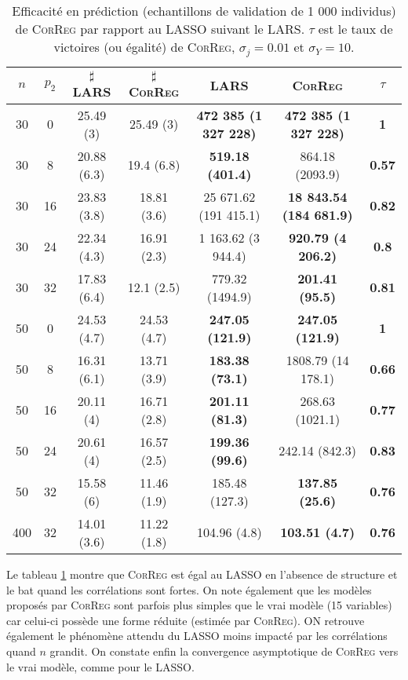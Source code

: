 \documentclass[12pt]{article}
\begin{document}
\begin{table}[h!]
\centering 
\begin{tabular}{|c|c|c|c|c|c|c|}
\hline 
$n$ & $p_2$ & $\sharp$ LARS & $\sharp$ \textsc{CorReg} &LARS & \textsc{CorReg} & $\tau$ \\ 
\hline  
30 & 0 & 25.49 (3) & 25.49 (3) & \textbf{472 385 (1 327 228)} & \textbf{472 385 (1 327 228)} & \textbf{1} \\
\hline 
30 & 8 & 20.88 (6.3) & 19.4 (6.8) & \textbf{519.18 (401.4)} & 864.18 (2093.9) &\textbf{ 0.57}  \\ 
\hline 
30 & 16 & 23.83 (3.8) & 18.81 (3.6) & 25 671.62 (191 415.1) & \textbf{18 843.54 (184 681.9)} & \textbf{0.82} \\ 
\hline 
30 & 24 & 22.34 (4.3) & 16.91 (2.3) & 1 163.62 (3 944.4) & \textbf{920.79 (4 206.2)} & \textbf{0.8} \\ 
\hline 
30 & 32 & 17.83 (6.4) & 12.1 (2.5) & 779.32 (1494.9) & \textbf{201.41 (95.5)} & \textbf{0.81}\\ 
\hline 
50 & 0 & 24.53 (4.7) & 24.53 (4.7) & \textbf{247.05 (121.9)} & \textbf{247.05 (121.9)} & \textbf{1}  \\ 
\hline 
50 & 8 & 16.31 (6.1) & 13.71 (3.9) & \textbf{183.38 (73.1)} & 1808.79 (14 178.1) & \textbf{0.66}\\ 
\hline 
50 & 16 & 20.11 (4) & 16.71 (2.8) & \textbf{201.11 (81.3)} & 268.63 (1021.1) & \textbf{0.77}\\ 
\hline 
50 & 24 &20.61 (4) & 16.57 (2.5) & \textbf{199.36 (99.6)} & 242.14 (842.3) & \textbf{0.83} \\ 
\hline 
50 & 32 & 15.58 (6) & 11.46 (1.9) & 185.48 (127.3) & \textbf{137.85 (25.6)} & \textbf{0.76 } \\ 
\hline 
400 & 32 & 14.01 (3.6) & 11.22 (1.8) & 104.96 (4.8) & \textbf{103.51 (4.7)} & \textbf{0.76}\\ 
\hline 
\end{tabular} 
\caption{Efficacité en prédiction (echantillons de validation de 1 000 individus) de \textsc{CorReg} par rapport au LASSO suivant le LARS. $\tau$ est le taux de victoires (ou égalité) de \textsc{CorReg}, $\sigma_j=0.01$ et $\sigma_Y=10$.} \label{tableMSEsim}
\end{table}
Le tableau \ref{tableMSEsim} montre que \textsc{CorReg} est égal au LASSO en l'absence de structure et le bat quand les corrélations sont fortes. On note également que les modèles proposés par 
\textsc{CorReg} sont parfois plus simples que le vrai modèle (15 variables) car celui-ci possède une forme réduite (estimée par \textsc{CorReg}). ON retrouve également le phénomène attendu du LASSO moins impacté par les corrélations quand $n$ grandit. On constate enfin la convergence asymptotique de \textsc{CorReg} vers le vrai modèle, comme pour le LASSO.
\end{document}
